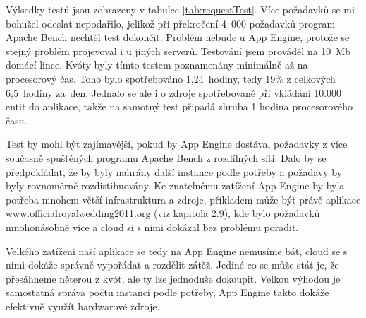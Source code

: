 Výlsedky testů jsou zobrazeny v tabulce \ref{tab:requestTest}. Více požadavků se mi bohužel odeslat nepodařilo, jelikož při překročení 4~000 požadavků program Apache Bench nechtěl test dokončit. Problém nebude u App Engine, protože se stejný problém projevoval i u jiných serverů. Testování jsem prováděl na 10~Mb domácí lince. Kvóty byly tímto testem poznamenány minimálně až na procesorový čas. Toho bylo spotřebováno 1,24~hodiny, tedy 19\% z celkových 6,5~hodiny za~den. Jednalo se ale i o zdroje spotřebované při vkládání 10.000 entit do aplikace, takže na samotný test připadá zhruba 1 hodina procesorového času.

Test by mohl být zajímavější, pokud by App Engine dostával požadavky z více současně spuštěných programu Apache Bench z rozdílných sítí. Dalo by se předpokládat, že by byly nahrány další instance podle potřeby a požadavy by byly rovnoměrně rozdistibuovány. Ke znatelnému zatížení App Engine by byla potřeba mnohem větší infrastruktura a zdroje, příkladem může být právě aplikace www.officialroyalwedding2011.org (viz kapitola 2.9), kde bylo požadavků mnohonásobně více a cloud si s nimi dokázal bez problému poradit.

Velkého zatížení naší aplikace se tedy na App Engine nemusíme bát, cloud se s nimi dokáže správně vypořádat a rozdělit zátěž. Jediné co se může stát je, že přesáhneme něterou z kvót, ale ty lze jednoduše dokoupit. Velkou výhodou je samostatná správa počtu instancí podle potřeby, App Engine takto dokáže efektivně využít hardwarové zdroje.
